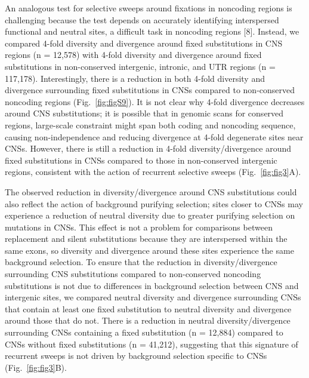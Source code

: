 An analogous test for selective sweeps around fixations in noncoding regions is challenging because the test depends on accurately identifying interspersed functional and neutral sites, a difficult task in noncoding regions [8]. Instead, we compared 4-fold diversity and divergence around fixed substitutions in CNS regions (n = 12,578) with 4-fold diversity and divergence around fixed substitutions in non-conserved intergenic, intronic, and UTR regions (n = 117,178). Interestingly, there is a reduction in both 4-fold diversity and divergence surrounding fixed substitutions in CNSs compared to non-conserved noncoding regions (Fig.~\ref{fig:figS9}). It is not clear why 4-fold divergence decreases around CNS substitutions; it is possible that in genomic scans for conserved regions, large-scale constraint might span both coding and noncoding sequence, causing non-independence and reducing divergence at 4-fold degenerate sites near CNSs. However, there is still a reduction in 4-fold diversity/divergence around fixed substitutions in CNSs compared to those in non-conserved intergenic regions, consistent with the action of recurrent selective sweeps (Fig.~\ref{fig:fig3}A). 

The observed reduction in diversity/divergence around CNS substitutions could also reflect the action of background purifying selection; sites closer to CNSs may experience a reduction of neutral diversity due to greater purifying selection on mutations in CNSs. This effect is not a problem for comparisons between replacement and silent substitutions because they are interspersed within the same exons, so diversity and divergence around these sites experience the same background selection. To ensure that the reduction in diversity/divergence surrounding CNS substitutions compared to non-conserved noncoding substitutions is not due to differences in background selection between CNS and intergenic sites, we compared neutral diversity and divergence surrounding CNSs that contain at least one fixed substitution to neutral diversity and divergence around those that do not. There is a reduction in neutral diversity/divergence surrounding CNSs containing a fixed substitution (n = 12,884) compared to CNSs without fixed substitutions (n = 41,212), suggesting that this signature of recurrent sweeps is not driven by background selection specific to CNSs (Fig.~\ref{fig:fig3}B).

